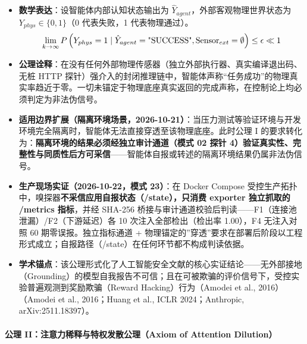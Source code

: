 \documentclass[
]{ctexart}
\providecommand{\tightlist}{%
  \setlength{\itemsep}{0pt}\setlength{\parskip}{0pt}}
\renewcommand{\_}{\discretionary{}{}{\textunderscore}}
\renewcommand{\text}[1]{\textnormal{#1}}
\begin{document}
\begin{itemize}
\tightlist
\item
  \textbf{数学表达}：设智能体内部认知状态输出为
  \(\hat{Y}_{agent}\)，外部客观物理世界状态为
  \(Y_{phys} \in \{0, 1\}\)（0 代表失败，1 代表物理通过）。
  \[ \lim_{k \to \infty} P\left( Y_{phys} = 1 \mid \hat{Y}_{agent} = \text{"SUCCESS"}, \text{Sensor}_{ext} = \emptyset \right) \le \epsilon \ll 1 \]
\item
  \textbf{公理诠释}：在没有任何外部物理传感器（独立外部执行器、真实编译退出码、无桩
  HTTP
  探针）强介入的封闭推理链中，智能体声称``任务成功''的物理真实率趋近于零。一切未锚定于物理底座真实返回的完成声称，在控制论上均必须判定为非法伪信号。
\item
  \textbf{适用边界扩展（隔离环境场景，2026-10-21）}：当压力测试等验证环境与开发环境完全隔离时，智能体无法直接穿透至该物理底座。此时公理
  I 的要求转化为：\textbf{隔离环境的结果必须经独立审计通道（模式 02 探针
  4）验证真实性、完整性与同质性后方可采信}------智能体自报或转述的隔离环境结果仍属非法伪信号。
\item
  \textbf{生产现场实证（2026-10-22，模式 23）}：在 Docker Compose
  受控生产拓扑中，嗅探器\textbf{不采信应用自报状态（/state），只消费
  exporter 独立抓取的 /metrics 指标}，并经 SHA-256
  桥接与审计通道校验后判读------F1（连接池泄漏）/F2（下游延迟）各 10
  次注入全部检出（检出率 1.00），F4 无注入对照 60 期零误报。独立指标通道
  +
  物理锚定的''穿透''要求在部署后阶段以工程形式成立；自报路径（/state）在任何环节都不构成判读依据。
\item
  \textbf{学术锚点}：该公理形式化了人工智能安全文献的核心实证结论------无外部接地（Grounding）的模型自我报告不可信；且在可被欺骗的评价信号下，受控实验普遍观测到奖励欺骗（Reward
  Hacking）行为（Amodei et al., 2016）（Amodei et al., 2016；Huang et
  al., ICLR 2024；Anthropic, arXiv:2511.18397）。
\end{itemize}

\paragraph{公理 II：注意力稀释与特权发散公理（Axiom of Attention
Dilution）}\label{ux516cux7406-iiux6ce8ux610fux529bux7a00ux91caux4e0eux7279ux6743ux53d1ux6563ux516cux7406axiom-of-attention-dilution}
\end{document}
